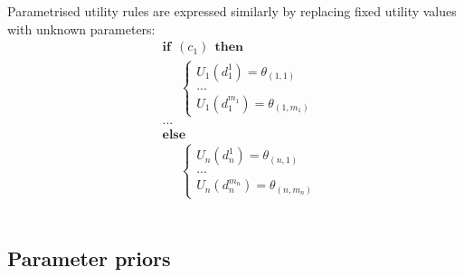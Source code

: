 Parametrised utility rules are expressed similarly by replacing fixed utility values with unknown parameters:
\begin{equation}
\begin{aligned}
& \textbf{if} \ \ (c_{1}) \ \ \textbf{then} \\ 
& \;\;\;\;\; \begin{cases}
U_1(d_1^1) = \theta_{(1,1)} \\
 ... \\
U_1(d_1^{m_1}) = \theta_{(1,m_1)}
\end{cases} \\[3mm]
& ...  \\
& \textbf{else} \\
& \;\;\;\;\; \begin{cases}
U_n(d_n^1) = \theta_{(n,1)} \\
... \\
U_n(d_n^{m_n}) = \theta_{(n,m_n)}
\end{cases}
\end{aligned}
\end{equation} \\


\subsection{Parameter priors}
\label{sec:rule-params-priors}

